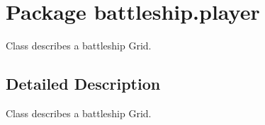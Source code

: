 \hypertarget{namespacebattleship_1_1player}{}\section{Package battleship.\+player}
\label{namespacebattleship_1_1player}


Class describes a battleship Grid.  




\subsection{Detailed Description}
Class describes a battleship Grid. 
